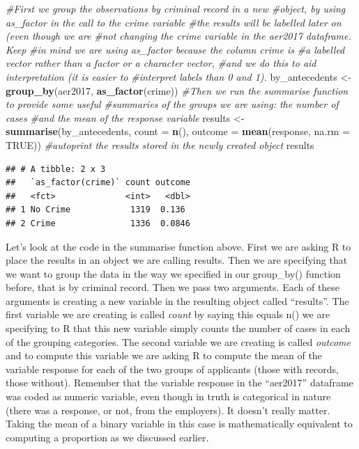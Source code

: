 \documentclass[]{book}
\newenvironment{Shaded}{\begin{snugshade}}{\end{snugshade}}
\newcommand{\CommentTok}[1]{\textcolor[rgb]{0.56,0.35,0.01}{\textit{#1}}}
\newcommand{\DataTypeTok}[1]{\textcolor[rgb]{0.13,0.29,0.53}{#1}}
\newcommand{\KeywordTok}[1]{\textcolor[rgb]{0.13,0.29,0.53}{\textbf{#1}}}
\newcommand{\NormalTok}[1]{#1}
\newcommand{\OtherTok}[1]{\textcolor[rgb]{0.56,0.35,0.01}{#1}}
\newcommand{\StringTok}[1]{\textcolor[rgb]{0.31,0.60,0.02}{#1}}
\theoremstyle{definition}
\theoremstyle{definition}
\theoremstyle{definition}
\theoremstyle{remark}
\begin{document}
\begin{Shaded}
\begin{Highlighting}[]
\CommentTok{#First we group the observations by criminal record in a new}
\CommentTok{#object, by using as_factor in the call to the crime variable}
\CommentTok{#the results will be labelled later on (even though we are}
\CommentTok{#not changing the crime variable in the aer2017 dataframe. Keep}
\CommentTok{#in mind we are using as_factor because the column crime is}
\CommentTok{#a labelled vector rather than a factor or a character vector,}
\CommentTok{#and we do this to aid interpretation (it is easier to}
\CommentTok{#interpret labels than 0 and 1).}
\NormalTok{by_antecedents <-}\StringTok{ }\KeywordTok{group_by}\NormalTok{(aer2017, }\KeywordTok{as_factor}\NormalTok{(crime))}
\CommentTok{#Then we run the summarise function to provide some useful}
\CommentTok{#summaries of the groups we are using: the number of cases}
\CommentTok{#and the mean of the response variable}
\NormalTok{results <-}\StringTok{ }\KeywordTok{summarise}\NormalTok{(by_antecedents,}
  \DataTypeTok{count =} \KeywordTok{n}\NormalTok{(),}
  \DataTypeTok{outcome =} \KeywordTok{mean}\NormalTok{(response, }\DataTypeTok{na.rm =} \OtherTok{TRUE}\NormalTok{))}
\CommentTok{#autoprint the results stored in the newly created object}
\NormalTok{results}
\end{Highlighting}
\end{Shaded}

\begin{verbatim}
## # A tibble: 2 x 3
##   `as_factor(crime)` count outcome
##   <fct>              <int>   <dbl>
## 1 No Crime            1319  0.136 
## 2 Crime               1336  0.0846
\end{verbatim}

Let's look at the code in the summarise function above. First we are
asking R to place the results in an object we are calling results. Then
we are specifying that we want to group the data in the way we specified
in our group\_by() function before, that is by criminal record. Then we
pass two arguments. Each of these arguments is creating a new variable
in the resulting object called ``results''. The first variable we are
creating is called \emph{count} by saying this equals n() we are
specifying to R that this new variable simply counts the number of cases
in each of the grouping categories. The second variable we are creating
is called \emph{outcome} and to compute this variable we are asking R to
compute the mean of the variable response for each of the two groups of
applicants (those with records, those without). Remember that the
variable response in the ``aer2017'' dataframe was coded as numeric
variable, even though in truth is categorical in nature (there was a
response, or not, from the employers). It doesn't really matter. Taking
the mean of a binary variable in this case is mathematically equivalent
to computing a proportion as we discussed earlier.
\end{document}
